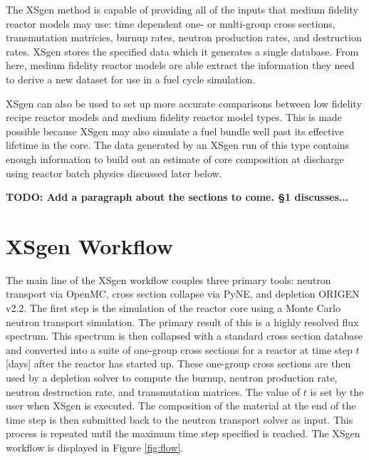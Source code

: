 \documentclass{article}
\newcommand{\TODO}[1] {{\color{red}\textbf{TODO: #1}}}
\begin{document}
The XSgen method is capable of providing all of the inputs that medium fidelity reactor models
may use: time dependent one- or multi-group cross sections, transmutation matricies,
burnup rates, neutron production rates, and destruction rates.
XSgen stores the specified data which it generates a single database.
From here, medium fidelity reactor models are able extract the information they need to
derive a new dataset for use in a fuel cycle simulation.

XSgen can also be used to set up more accurate comparisons between low fidelity recipe reactor
models and medium fidelity reactor model types. This is made possible because XSgen may also
simulate a fuel bundle well past its effective lifetime in the core. The data generated by an
XSgen run of this type contains enough information to build out an estimate of core composition
at discharge using reactor batch physics discussed later below.

\TODO{Add a paragraph about the sections to come. \S 1 discusses...}

\section{XSgen Workflow}
The main line of the XSgen workflow couples three primary tools: neutron transport via OpenMC,
cross section collapse via PyNE, and depletion ORIGEN v2.2. The first step is the simulation
of the reactor core using a Monte Carlo neutron transport simulation. The primary result of
this is a highly resolved flux spectrum. This spectrum is then collapsed with a standard
cross section database and converted into a suite of one-group cross sections for a reactor
at time step $t$ [days] after the reactor has started up. These one-group cross sections are
then used by a depletion solver to compute the burnup, neutron production rate, neutron
destruction rate, and transmutation matrices. The value of $t$ is set by the user when XSgen
is executed. The composition of the material at the end of the time step is then submitted
back to the neutron transport solver as input. This process is repeated until the maximum time
step specified is reached. The XSgen workflow is displayed in Figure \ref{fig:flow}.
\end{document}
